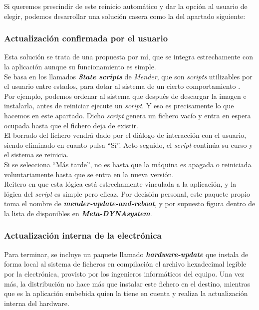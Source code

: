 Si queremos prescindir de este reinicio automático y dar la opción al usuario de elegir, podemos desarrollar una solución casera como la del apartado siguiente:

\subsubsection{Actualización confirmada por el usuario}

Esta solución se trata de una propuesta por mí, que se integra estrechamente con la aplicación aunque su funcionamiento es simple.\\

Se basa en los llamados \textbf{\textit{State scripts}} de \textit{Mender}, que son \textit{scripts} utilizables por el usuario entre estados, para dotar al sistema de un cierto comportamiento \cite{state-scripts-mender}.\\

Por ejemplo, podemos ordenar al sistema que después de descargar la imagen e instalarla, antes de reiniciar ejecute un \textit{script}. Y eso es precisamente lo que hacemos en este apartado. Dicho \textit{script} genera un fichero vacío y entra en espera ocupada hasta que el fichero deja de existir.\\

El borrado del fichero vendrá dado por el diálogo de interacción con el usuario, siendo eliminado en cuanto pulsa ``Sí''. Acto seguido, el \textit{script} continúa su curso y el sistema se reinicia.\\

Si se selecciona ``Más tarde'', no es hasta que la máquina es apagada o reiniciada voluntariamente hasta que se entra en la nueva versión.\\

Reitero en que esta lógica está estrechamente vinculada a la aplicación, y la lógica del \textit{script} es simple pero eficaz. Por decisión personal, este paquete propio toma el nombre de \textbf{\textit{mender-update-and-reboot}}, y por supuesto figura dentro de la lista de disponibles en \textbf{\textit{Meta-DYNAsystem}}.

\subsubsection{Actualización interna de la electrónica}

Para terminar, se incluye un paquete llamado \textbf{\textit{hardware-update}} que instala de forma local al sistema de ficheros en compilación el archivo hexadecimal legible por la electrónica, provisto por los ingenieros informáticos del equipo. Una vez más, la distribución no hace más que instalar este fichero en el destino, mientras que es la aplicación embebida quien la tiene en cuenta y realiza la actualización interna del hardware.

